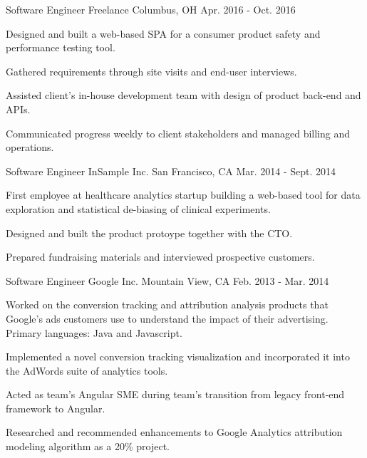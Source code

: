 \begin{cventries}
  \cventry
    {Software Engineer} %
    {Freelance} %
    {Columbus, OH} %
    {Apr. 2016 - Oct. 2016} %
    {
      \begin{cvitems} %
        \item {Designed and built a web-based SPA for a consumer product safety and performance testing tool.}
        \item {Gathered requirements through site visits and end-user interviews.}
        \item {Assisted client's in-house development team with design of product back-end and APIs.}
        \item {Communicated progress weekly to client stakeholders and managed billing and operations.}
      \end{cvitems}
    }

  \cventry
    {Software Engineer} %
    {InSample Inc.} %
    {San Francisco, CA} %
    {Mar. 2014 - Sept. 2014} %
    {
      \begin{cvitems} %
        \item {First employee at healthcare analytics startup building a web-based tool for data exploration and statistical de-biasing of clinical experiments.}
        \item {Designed and built the product protoype together with the CTO.}
        \item {Prepared fundraising materials and interviewed prospective customers.}
      \end{cvitems}
    }

  \cventry
    {Software Engineer} %
    {Google Inc.} %
    {Mountain View, CA} %
    {Feb. 2013 - Mar. 2014} %
    {
      \begin{cvitems} %
        \item {Worked on the conversion tracking and attribution analysis products that Google’s ads customers use to understand the impact of their advertising. Primary languages: Java and Javascript.}
        \item {Implemented a novel conversion tracking visualization and incorporated it into the AdWords suite of analytics tools.}
        \item {Acted as team's Angular SME during team's transition from legacy front-end framework to Angular.}
        \item {Researched and recommended enhancements to Google Analytics attribution modeling algorithm as a 20\% project.}
      \end{cvitems}
    }


\end{cventries}
